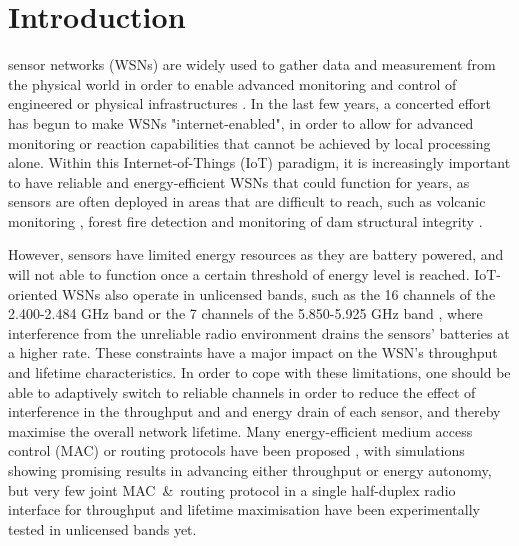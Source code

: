 \section{Introduction}

 sensor networks (WSNs) are widely used to gather data and measurement from the physical world in order to enable advanced monitoring and control of engineered or physical infrastructures \cite{wsnsurvey}. In the last few years, a concerted effort has begun to make WSNs "internet-enabled", in order to allow for advanced monitoring or reaction capabilities that cannot be achieved by local processing alone. Within this Internet-of-Things (IoT) paradigm,  it is increasingly important to have reliable and energy-efficient WSNs that could function for years, as sensors are often deployed in areas that are difficult to reach, such as volcanic monitoring \cite{volcano}, forest fire detection \cite{forestFire} and monitoring of dam structural integrity \cite{dam}.

However, sensors have limited energy resources as they are battery powered, and will not able to function once a certain threshold of energy level is reached. 
IoT-oriented WSNs also operate in unlicensed bands, such as the 16 channels of the 2.400-2.484 GHz band \cite{80215} or the 7 channels of the 5.850-5.925 GHz band \cite{80211}, where interference from the unreliable radio environment drains the sensors' batteries at a higher rate. These constraints have a major impact on the WSN's throughput and lifetime characteristics. In order to cope with these limitations, one should be able to adaptively  switch to reliable channels in order to reduce the effect of interference in the throughput and and energy drain of each sensor, and thereby maximise the overall network lifetime.
Many energy-efficient medium access control (MAC) or routing protocols have been proposed \cite{micmac, orchestra} \cite{winter2012rpl, ctp, leach}, with simulations showing promising results in advancing either throughput or energy autonomy, but very few joint MAC\ \&\ routing protocol in a single half-duplex radio interface \cite{chrysso, cmac, cognitiveSurvey} for throughput and lifetime maximisation have been experimentally tested in unlicensed bands yet. %


